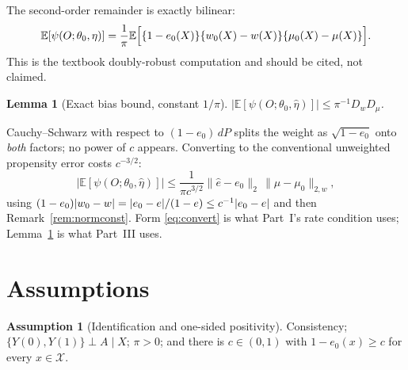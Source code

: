 \documentclass[11pt]{article}
\theoremstyle{plain}
\newtheorem{lemma}{Lemma}
\theoremstyle{definition}
\newtheorem{assumption}{Assumption}
\theoremstyle{remark}
\newcommand{\E}{\mathbb{E}}
\newcommand{\cX}{\mathcal{X}}
\newcommand{\ez}{e_0}
\newcommand{\mz}{\mu_0}
\newcommand{\wz}{w_0}
\newcommand{\ehat}{\widehat{e}}
\newcommand{\mhat}{\widehat{\mu}}
\newcommand{\Dw}{D_w}
\newcommand{\Dm}{D_\mu}
\newcommand{\Ltwo}[1]{\lVert #1 \rVert_{2}}
\newcommand{\Lw}[1]{\lVert #1 \rVert_{2,w}}
\DeclarePairedDelimiter{\abs}{\lvert}{\rvert}
\begin{document}
The second-order remainder is exactly bilinear:
\begin{equation}\label{eq:bilinear}
  \E[\psi(O;\theta_0,\eta)]
  =\frac1\pi\E\Bigl[\{1-\ez(X)\}\{\wz(X)-w(X)\}\{\mz(X)-\mu(X)\}\Bigr].
\end{equation}
This is the textbook doubly-robust computation
\citep{robins1995,vanderlaan2003,kennedy2024} and should be cited, not claimed.

\begin{lemma}[Exact bias bound, constant $1/\pi$]\label{lem:biasbound}
$\bigl\lvert\E[\psi(O;\theta_0,\widehat\eta)]\bigr\rvert\le\pi^{-1}\Dw\Dm$.
\end{lemma}

\noindent Cauchy--Schwarz with respect to $(1-\ez)\,dP$ splits the weight as
$\sqrt{1-\ez}$ onto \emph{both} factors; no power of $c$ appears. Converting to
the conventional unweighted propensity error costs $c^{-3/2}$:
\begin{equation}\label{eq:convert}
  \bigl\lvert\E[\psi(O;\theta_0,\widehat\eta)]\bigr\rvert
  \le\frac1{\pi c^{3/2}}\Ltwo{\ehat-\ez}\,\Lw{\mhat-\mz},
\end{equation}
using $(1-\ez)\abs{\wz-w}=\abs{\ez-e}/(1-e)\le c^{-1}\abs{\ez-e}$ and then
Remark~\ref{rem:normconst}. Form \eqref{eq:convert} is what Part~I's rate
condition uses; Lemma~\ref{lem:biasbound} is what Part~III uses.

\section{Assumptions}

\begin{assumption}[Identification and one-sided positivity]\label{ass:causal}
Consistency; $\{Y(0),Y(1)\}\perp A\mid X$; $\pi>0$; and there is $c\in(0,1)$ with
$1-\ez(x)\ge c$ for every $x\in\cX$.
\end{assumption}
\end{document}
